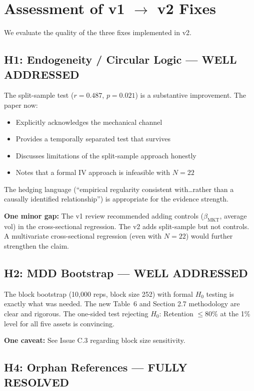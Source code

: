 \documentclass[12pt,a4paper]{article}
\begin{document}
\section{Assessment of v1 $\to$ v2 Fixes}

We evaluate the quality of the three fixes implemented in v2.

\subsection{H1: Endogeneity / Circular Logic --- \textcolor{green!60!black}{\textbf{WELL ADDRESSED}}}

The split-sample test ($r = 0.487$, $p = 0.021$) is a substantive improvement. The paper now:
\begin{itemize}
\item Explicitly acknowledges the mechanical channel
\item Provides a temporally separated test that survives
\item Discusses limitations of the split-sample approach honestly
\item Notes that a formal IV approach is infeasible with $N = 22$
\end{itemize}
The hedging language (``empirical regularity consistent with\ldots rather than a causally identified relationship'') is appropriate for the evidence strength.

\textbf{One minor gap:} The v1 review recommended adding controls ($\beta_{\text{MKT}}$, average vol) in the cross-sectional regression. The v2 adds split-sample but not controls. A multivariate cross-sectional regression (even with $N = 22$) would further strengthen the claim.

\subsection{H2: MDD Bootstrap --- \textcolor{green!60!black}{\textbf{WELL ADDRESSED}}}

The block bootstrap (10,000 reps, block size 252) with formal $H_0$ testing is exactly what was needed. The new Table~6 and Section 2.7 methodology are clear and rigorous. The one-sided test rejecting $H_0$: Retention $\leq 80\%$ at the 1\% level for all five assets is convincing.

\textbf{One caveat:} See Issue C.3 regarding block size sensitivity.

\subsection{H4: Orphan References --- \textcolor{green!60!black}{\textbf{FULLY RESOLVED}}}
\end{document}
